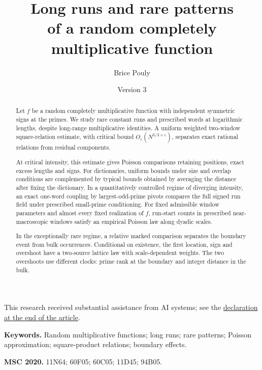 \documentclass[11pt,a4paper]{article}
\title{\textbf{Long runs and rare patterns}\\[1mm]
\large of a random completely multiplicative function}
\author{Brice Pouly}
\date{Version 3}
\begin{document}
\maketitle
\vspace{-0.6em}
\noindent\begin{minipage}{\textwidth}\footnotesize
This research received substantial assistance from AI systems; see the
\hyperref[sec:ai-assistance]{declaration at the end of the article}.
\end{minipage}\medskip
\begin{abstract}
Let $f$ be a random completely multiplicative function with independent
symmetric signs at the primes. We study rare constant runs and prescribed
words at logarithmic lengths, despite long-range multiplicative identities.
A uniform weighted two-window square-relation estimate, with critical
bound $O_\varepsilon(N^{5/3+\varepsilon})$, separates exact rational
relations from residual components.

At critical intensity, this estimate gives Poisson comparisons retaining
positions, exact excess lengths and signs. For dictionaries, uniform
bounds under size and overlap conditions are complemented by typical
bounds obtained by averaging the distance after fixing the dictionary.
In a quantitatively controlled regime of diverging intensity, an exact
one-word coupling by largest-odd-prime pivots compares the full signed
run field under prescribed small-prime conditioning. For fixed
admissible window parameters and almost every fixed realization of $f$,
run-start counts in prescribed near-macroscopic windows satisfy an
empirical Poisson law along dyadic scales.

In the exceptionally rare regime, a relative marked comparison separates
the boundary event from bulk occurrences. Conditional on existence, the
first location, sign and overshoot have a two-source lattice law with
scale-dependent weights. The two overshoots use different clocks: prime
rank at the boundary and integer distance in the bulk.
\end{abstract}

\medskip
\noindent\textbf{Keywords.} Random multiplicative functions; long runs;
rare patterns; Poisson approximation; square-product relations; boundary effects.
\par\smallskip
\noindent\textbf{MSC 2020.} 11N64; 60F05; 60C05; 11D45; 94B05.
\clearpage
\tableofcontents









\printbibliography[heading=bibintoc,title={References}]
\end{document}
